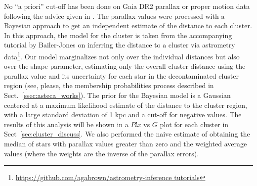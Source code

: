 \documentclass[draft]{aa}
\begin{document}
No ``a priori'' cut-off has been done on Gaia DR2 parallax or proper motion
data following the advice given in \cite{Luri_2018}. The parallax values were
processed with a Bayesian approach to get an independent estimate of the
distance to each cluster. In this approach, the model for the cluster is
taken from the accompanying tutorial by Bailer-Jones on inferring the distance
to a cluster via astrometry
data\footnote{\url{https://github.com/agabrown/astrometry-inference tutorials}}.
Our model marginalizes not only over the individual distances but also over the
shape parameter, estimating only the overall cluster distance using the
parallax value and its uncertainty for each star in the decontaminated cluster
region (see, please, the membership
probabilities process described in Sect.~\ref{ssec:asteca_works}).
The prior for the Bayesian model is a Gaussian centered at a maximum likelihood
estimate of the distance to the cluster region, with a large standard deviation
of 1 kpc and a cut-off for negative values. The results of this analysis will
be shown in a $Plx$ vs $G$ plot for each cluster in
Sect~\ref{sec:cluster_discuss}. We also performed the naive estimate of
obtaining the median of stars with parallax values greater than zero
and the weighted average values (where the weights are the inverse of the
parallax errors). 

%


\end{document}

